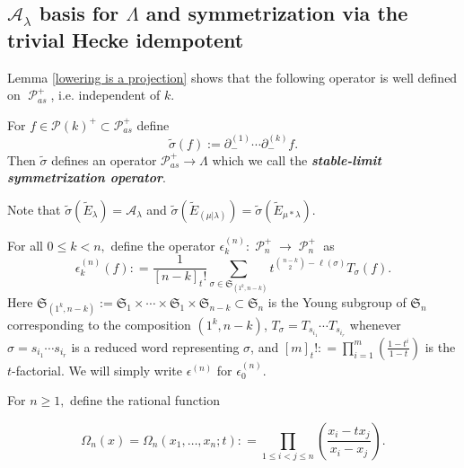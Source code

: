 \documentclass[ALCO,Unicode]{cedram}
\DeclareMathOperator{\sP}{\mathscr{P} }
\begin{document}
\subsection{\texorpdfstring{$\mathcal{A}_{\lambda}$}{A\_lambda} basis for \texorpdfstring{$\Lambda$}{Lambda} and symmetrization via the trivial Hecke idempotent}\label{symmetrization subsection}

Lemma \ref{lowering is a projection} shows that the following operator is well defined on $\sP_{as}^{+}$, i.e. independent of $k$.
\begin{defi} \label{defn8}

For $f\in \mathscr{P}(k)^{+} \subset \mathscr{P}_{as}^{+}$  define 
\begin{equation}\label{stable limit symmetrization}
    \widetilde{\sigma}(f) := \partial_{-}^{(1)}\cdots \partial_{-}^{(k)} f .
\end{equation} Then $\widetilde{\sigma}$ defines an operator $\mathscr{P}_{as}^{+} \rightarrow \Lambda$ which we call the \textbf{\textit{stable-limit symmetrization operator}}. 
\end{defi}

\begin{rema}
    Note that $\widetilde{\sigma}( \widetilde{E}_{ \lambda}) = \mathcal{A}_{\lambda}$ and $\widetilde{\sigma}(\widetilde{E}_{(\mu|\lambda)}) = \widetilde{\sigma}(\widetilde{E}_{\mu*\lambda}).$ 
\end{rema}


\begin{defi}\label{idempotents}
For all $0 \leq k < n,$ define the operator $\epsilon^{(n)}_k: \sP_n^{+} \rightarrow \sP_n^{+}$ as 
\begin{equation}\label{idempotent eq version 1}
\epsilon^{(n)}_k(f) : = \frac{1}{[n-k]_{t}!} \sum_{\sigma \in \mathfrak{S}_{(1^k,n-k)}} t^{\binom{n-k}{2} - \ell(\sigma)} T_{\sigma}(f).
\end{equation}
Here $\mathfrak{S}_{(1^k,n-k)} := \mathfrak{S}_1\times \cdots \times \mathfrak{S}_1 \times \mathfrak{S}_{n-k} \subset \mathfrak{S}_{n}$ is the Young subgroup of $\mathfrak{S}_{n}$ corresponding to the composition $(1^k,n-k)$, $T_{\sigma} = T_{s_{i_1}}\cdots T_{s_{i_r}}$ whenever $\sigma = s_{i_1}\cdots s_{i_r}$ is a reduced word representing $\sigma$, and $[m]_{t}! : = \prod_{i=1}^{m}(\frac{1-t^i}{1-t})$ is the $t$-factorial. We will simply write $\epsilon^{(n)}$ for $\epsilon^{(n)}_0$.

For $n \geq 1,$ define the rational function 

\begin{equation}\label{HL kernel}
    \Omega_n(x) = \Omega_n(x_1,\ldots,x_n;t): = \prod_{1\leq i<j\leq n}\left(\frac{x_i - tx_j}{x_i - x_j}\right).
\end{equation}

\end{defi}
\end{document}
